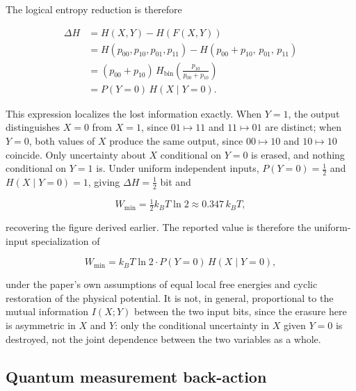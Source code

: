 \documentclass[11pt]{article}
\begin{document}
The logical entropy reduction is therefore

\[
\begin{aligned}
\Delta H &= H(X,Y) - H(F(X,Y)) \\
&= H(p_{00},p_{10},p_{01},p_{11}) - H(p_{00}+p_{10},\,p_{01},\,p_{11}) \\
&= (p_{00}+p_{10})\,H_{\mathrm{bin}}\!\left(\frac{p_{10}}{p_{00}+p_{10}}\right) \\
&= P(Y=0)\,H(X\mid Y=0).
\end{aligned}
\]

This expression localizes the lost information exactly. When $Y=1$, the output distinguishes $X=0$ from $X=1$, since $01\mapsto11$ and $11\mapsto01$ are distinct; when $Y=0$, both values of $X$ produce the same output, since $00\mapsto10$ and $10\mapsto10$ coincide. Only uncertainty about $X$ conditional on $Y=0$ is erased, and nothing conditional on $Y=1$ is. Under uniform independent inputs, $P(Y=0)=\tfrac12$ and $H(X\mid Y=0)=1$, giving $\Delta H=\tfrac12$ bit and

\[
W_{\min} = \tfrac12 k_BT\ln2 \approx 0.347\,k_BT,
\]

recovering the figure derived earlier. The reported value is therefore the uniform-input specialization of

\[
W_{\min} = k_BT\ln2\cdot P(Y=0)\,H(X\mid Y=0),
\]

under the paper's own assumptions of equal local free energies and cyclic restoration of the physical potential. It is not, in general, proportional to the mutual information $I(X;Y)$ between the two input bits, since the erasure here is asymmetric in $X$ and $Y$: only the conditional uncertainty in $X$ given $Y=0$ is destroyed, not the joint dependence between the two variables as a whole.

\subsection{Quantum measurement back-action}
\end{document}
